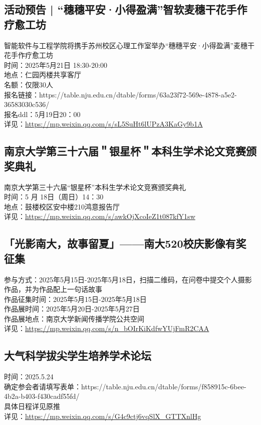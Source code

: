 \documentclass[letterpaper, 12pt]{article}
\begin{document}
\begin{multicols}{2}
\subsection{活动预告 | “穗穗平安·小得盈满”智软麦穗干花手作疗愈工坊} %
智能软件与工程学院将携手苏州校区心理工作室举办“穗穗平安·小得盈满”麦穗干花手作疗愈工坊
\\时间：2025年5月21日 18:30-20:00  
\\地点：仁园丙楼共享客厅  
\\名额：仅限30人  
\\报名链接：https://table.nju.edu.cn/dtable/forms/63a23f72-569e-4878-a5e2-36583030c536/
\\报名ddl：5月19日20：00
\\详见：\url{https://mp.weixin.qq.com/s/sL5SuHt6lUPzA3KaGy9b1A}

\subsection{ 南京大学第三十六届＂银星杯＂本科生学术论文竞赛颁奖典礼} %
南京大学第三十六届“银星杯”本科生学术论文竞赛颁奖典礼
\\时间：5 月 18日（周日）14：30
\\地点：鼓楼校区安中楼210鸿意报告厅
\\详见：\url{https://mp.weixin.qq.com/s/awkOjXcoIeZ1t087kfY1sw}



\subsection{「光影南大，故事留夏」——南大520校庆影像有奖征集} %
参与方式：2025年5月15日-2025年5月18日，扫描二维码，在问卷中提交个人摄影作品，并为作品配上一句话故事
\\作品征集时间：2025年5月15日-2025年5月18日
\\作品展时间：2025年5月20日-2025年5月27日
\\作品展地点：南京大学新闻传播学院公共空间
\\详见：\url{https://mp.weixin.qq.com/s/n_bOIrKiKdfwYUjFmR2CAA}

\subsection{大气科学拔尖学生培养学术论坛} %
时间：2025.5.24
\\确定参会者请填写表单：https://table.nju.edu.cn/dtable/forms/f858915c-6bee-4b2a-b403-f430cadf55fd/
\\具体日程详见原推
\\详见：\url{https://mp.weixin.qq.com/s/G4c9ctj6vqSlX_GTTXnlHg}



\end{multicols}
\end{document}
